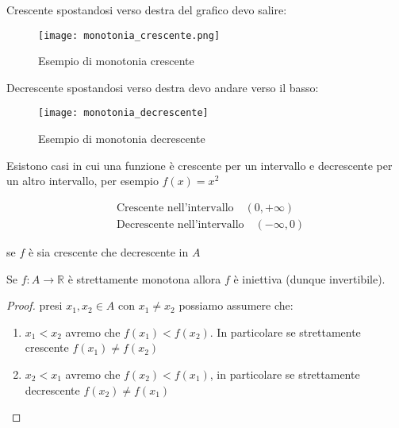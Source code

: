 \documentclass[../main.tex, class=article, 12pt]{subfiles}
\begin{document}
\begin{exmp}
        Crescente spostandosi verso destra del grafico devo salire:
        \begin{figure}[H]
          	\texttt{[image: monotonia\_crescente.png]}
          	\caption{Esempio di monotonia crescente}
                \label{fig:monotonia_crescente}
        \end{figure}
        
        Decrescente spostandosi verso destra devo andare verso il basso:

       \begin{figure}[H]
         	\texttt{[image: monotonia\_decrescente]}
         	\caption{Esempio di monotonia decrescente}
               \label{fig:monotonia_decrescente}
       \end{figure}
       
       Esistono casi in cui una funzione è crescente per un intervallo e decrescente per un altro intervallo, per esempio $ f(x) = x^2 $
      


       \begin{align*}
               & \mbox{Crescente nell'intervallo} \quad (0, +\infty) \\
               & \mbox{Decrescente nell'intervallo} \quad (-\infty, 0)
       \end{align*}

       \begin{tcolorbox}
       \begin{oss}
               se $ f $ è sia crescente che decrescente in $ A $ 
       \end{oss}
       \end{tcolorbox}
        
       \begin{tcolorbox}
        \begin{prop}
               Se $ f:A \to \mathbb{R} $ è strettamente monotona allora $ f $ è iniettiva (dunque invertibile). 
               \begin{proof}
                      presi $ x_1,x_2 \in A $ con $ x_1 \not = x_2 $                    possiamo assumere che:
                      \begin{enumerate}
                              \item $ x_1 < x_2 $ avremo che $ f(x_1) < f(x_2) $. In particolare se strettamente crescente $ f(x_1) \not = f(x_2) $
                              \item $ x_2 < x_1 $ avremo che $ f(x_2) < f(x_1) $, in particolare se strettamente decrescente $ f(x_2) \not = f(x_1) $
                      \end{enumerate}
               \end{proof}
       \end{prop}
       \end{tcolorbox}
\end{exmp}
\end{document}
